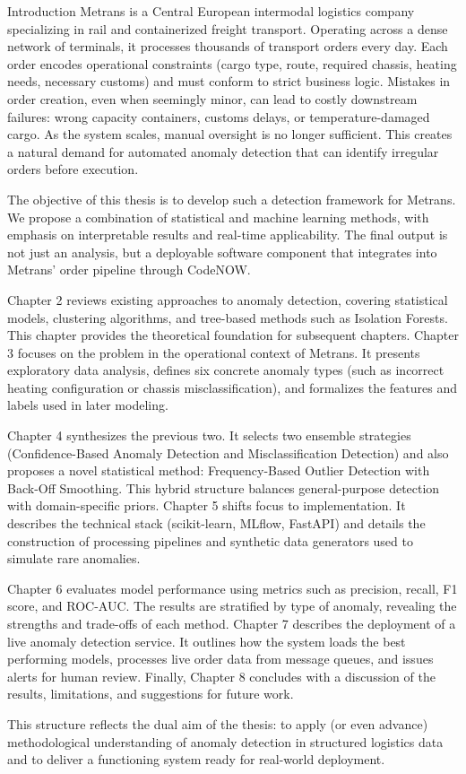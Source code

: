 \chap Introduction
Metrans is a Central European intermodal logistics company specializing in rail and containerized freight transport. Operating across a dense network of terminals, it processes thousands of transport orders every day. Each order encodes operational constraints (cargo type, route, required chassis, heating needs, necessary customs) and must conform to strict business logic. Mistakes in order creation, even when seemingly minor, can lead to costly downstream failures: wrong capacity containers, customs delays, or temperature-damaged cargo. As the system scales, manual oversight is no longer sufficient. This creates a natural demand for automated anomaly detection that can identify irregular orders before execution.

The objective of this thesis is to develop such a detection framework for Metrans. We propose a combination of statistical and machine learning methods, with emphasis on interpretable results and real-time applicability. The final output is not just an analysis, but a deployable software component that integrates into Metrans’ order pipeline through CodeNOW.

Chapter 2 reviews existing approaches to anomaly detection, covering statistical models, clustering algorithms, and tree-based methods such as Isolation Forests. This chapter provides the theoretical foundation for subsequent chapters. Chapter 3 focuses on the problem in the operational context of Metrans. It presents exploratory data analysis, defines six concrete anomaly types (such as incorrect heating configuration or chassis misclassification), and formalizes the features and labels used in later modeling.

Chapter 4 synthesizes the previous two. It selects two ensemble strategies (Confidence-Based Anomaly Detection and Misclassification Detection) and also proposes a novel statistical method: Frequency-Based Outlier Detection with Back-Off Smoothing. This hybrid structure balances general-purpose detection with domain-specific priors. Chapter 5 shifts focus to implementation. It describes the technical stack (scikit-learn, MLflow, FastAPI) and details the construction of processing pipelines and synthetic data generators used to simulate rare anomalies.

Chapter 6 evaluates model performance using metrics such as precision, recall, F1 score, and ROC-AUC. The results are stratified by type of anomaly, revealing the strengths and trade-offs of each method. Chapter 7 describes the deployment of a live anomaly detection service. It outlines how the system loads the best performing models, processes live order data from message queues, and issues alerts for human review. Finally, Chapter 8 concludes with a discussion of the results, limitations, and suggestions for future work.

This structure reflects the dual aim of the thesis: to apply (or even advance) methodological understanding of anomaly detection in structured logistics data and to deliver a functioning system ready for real-world deployment.
